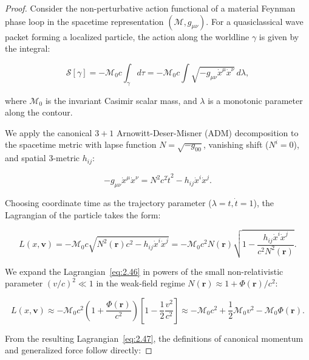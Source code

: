 \begin{proof}
Consider the non-perturbative action functional of a material Feynman phase loop in the spacetime representation $(\mathcal{M}, g_{\mu\nu})$. For a quasiclassical wave packet forming a localized particle, the action along the worldline $\gamma$ is given by the integral:

\begin{equation}\label{eq:2.44}\label{eq:2.94}\tag{2.44}
\mathcal{S}[\gamma] = -\mathcal{M}_0 c \int_{\gamma} d\tau = -\mathcal{M}_0 c \int \sqrt{-g_{\mu\nu} \dot{x}^\mu \dot{x}^\nu} \, d\lambda,
\end{equation}

where $\mathcal{M}_0$ is the invariant Casimir scalar mass, and $\lambda$ is a monotonic parameter along the contour.

We apply the canonical $3+1$ Arnowitt-Deser-Misner (ADM) decomposition to the spacetime metric with lapse function $N = \sqrt{-g_{00}}$, vanishing shift ($N^i = 0$), and spatial 3-metric $h_{ij}$:

\begin{equation}\label{eq:2.45}\label{eq:2.95}\tag{2.45}
-g_{\mu\nu}\dot{x}^\mu \dot{x}^\nu = N^2 c^2 \dot{t}^2 - h_{ij}\dot{x}^i \dot{x}^j.
\end{equation}

Choosing coordinate time as the trajectory parameter ($\lambda = t, \dot{t} = 1$), the Lagrangian of the particle takes the form:

\begin{equation}\label{eq:2.46}\label{eq:2.96}\tag{2.46}
L(x, \mathbf{v}) = -\mathcal{M}_0 c \sqrt{N^2(\mathbf{r}) c^2 - h_{ij}\dot{x}^i \dot{x}^j} = -\mathcal{M}_0 c^2 N(\mathbf{r}) \sqrt{1 - \frac{h_{ij}\dot{x}^i \dot{x}^j}{c^2 N^2(\mathbf{r})}}.
\end{equation}

We expand the Lagrangian~\eqref{eq:2.46} in powers of the small non-relativistic parameter $(v/c)^2 \ll 1$ in the weak-field regime $N(\mathbf{r}) \approx 1 + \Phi(\mathbf{r})/c^2$:

\begin{equation}\label{eq:2.47}\label{eq:2.97}\tag{2.47}
L(x, \mathbf{v}) \approx -\mathcal{M}_0 c^2 \left( 1 + \frac{\Phi(\mathbf{r})}{c^2} \right) \left[ 1 - \frac{1}{2}\frac{v^2}{c^2} \right] \approx -\mathcal{M}_0 c^2 + \frac{1}{2}\mathcal{M}_0 v^2 - \mathcal{M}_0 \Phi(\mathbf{r}).
\end{equation}

From the resulting Lagrangian~\eqref{eq:2.47}, the definitions of canonical momentum and generalized force follow directly:


\end{proof}
